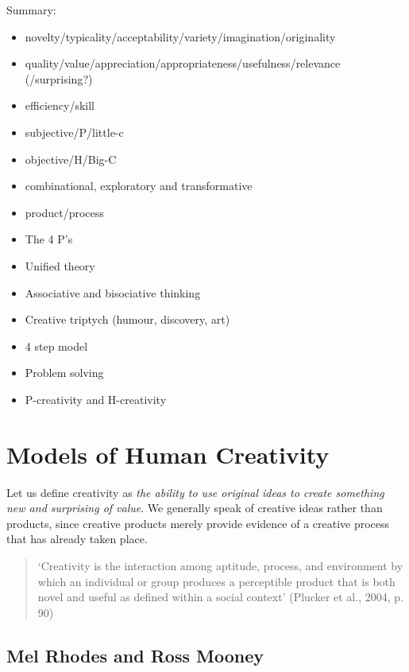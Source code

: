 \begin{shaded}
  Summary:
  \begin{itemize}
    \item novelty/typicality/acceptability/variety/imagination/originality
    \item quality/value/appreciation/appropriateness/usefulness/relevance (/surprising?)
    \item efficiency/skill
    \item subjective/P/little-c
    \item objective/H/Big-C
    \item combinational, exploratory and transformative
    \item product/process
    \item The 4 P’s
    \item Unified theory
    \item Associative and bisociative thinking
    \item Creative triptych (humour, discovery, art)
    \item 4 step model
    \item Problem solving
    \item P-creativity and H-creativity
  \end{itemize}
\end{shaded}

\clearpage

\section{Models of Human Creativity}


Let us define creativity as \emph{the ability to use original ideas to create something new and surprising of value}. We generally speak of creative ideas rather than products, since creative products merely provide evidence of a creative process that has already taken place.

\begin{quote}
  ‘Creativity is the interaction among aptitude, process, and environment by which an individual or group produces a perceptible product that is both novel and useful as defined within a social context’ (Plucker et al., 2004, p. 90) \citep{Jordanous2012}
\end{quote}

\subsection{Mel Rhodes and Ross Mooney}

